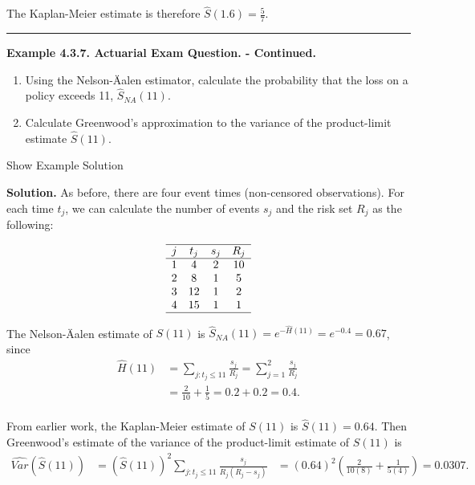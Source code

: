 \documentclass[]{book}
\providecommand{\tightlist}{%
  \setlength{\itemsep}{0pt}\setlength{\parskip}{0pt}}
\theoremstyle{definition}
\theoremstyle{definition}
\theoremstyle{definition}
\theoremstyle{remark}
\begin{document}
The Kaplan-Meier estimate is therefore \(\hat{S}(1.6) = \frac{5}{7}\).

\begin{center}\rule{0.5\linewidth}{\linethickness}\end{center}

\textbf{Example 4.3.7. Actuarial Exam Question. - Continued.}

\begin{enumerate}
\def\labelenumi{\alph{enumi})}
\tightlist
\item
  Using the Nelson-Äalen estimator, calculate the probability that the
  loss on a policy exceeds 11, \(\hat{S}_{NA}(11)\).
\item
  Calculate Greenwood's approximation to the variance of the
  product-limit estimate \(\hat{S}(11)\).
\end{enumerate}

Show Example Solution

\hypertarget{toggleExampleSelect.3.7}{}
\textbf{Solution.} As before, there are four event times (non-censored
observations). For each time \(t_j\), we can calculate the number of
events \(s_j\) and the risk set \(R_j\) as the following:

\[
\begin{array}{cccc}
\hline
j & t_j & s_j & R_j \\
\hline
1 & 4 & 2 & 10 \\
2 & 8 & 1 & 5 \\
3 & 12 & 1 & 2 \\
4 & 15 & 1 & 1 \\
\hline
\end{array}
\]

The Nelson-Äalen estimate of \(S(11)\) is
\(\hat{S}_{NA}(11)=e^{-\hat{H}(11)} = e^{-0.4} = 0.67\), since \[
\begin{aligned}
\hat{H}(11) &= \sum_{j:t_j\leq 11} \frac{s_j}{R_j}  = \sum_{j=1}^{2} \frac{s_j}{R_j}  \\
&= \frac{2}{10} + \frac{1}{5}  = 0.2 + 0.2 = 0.4 .\\
\end{aligned}
\]

From earlier work, the Kaplan-Meier estimate of \(S(11)\) is
\(\hat{S}(11) = 0.64\). Then Greenwood's estimate of the variance of the
product-limit estimate of \(S(11)\) is \[
\begin{aligned}
\widehat{Var}(\hat{S}(11)) &= (\hat{S}(11))^2 \sum_{j:t_j\leq 11} \frac{s_j}{R_j(R_j-s_j)}
&= (0.64)^2 \left(\frac{2}{10(8)} + \frac{1}{5(4)} \right)  = 0.0307. \\
\end{aligned}
\]
\end{document}
